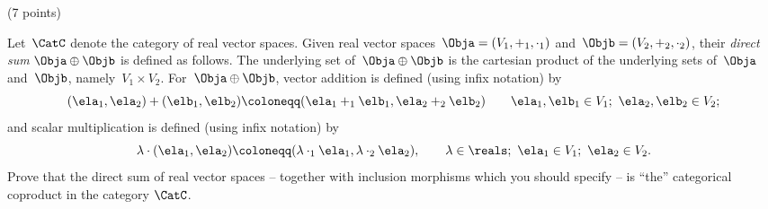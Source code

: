 \documentclass[paper=8.125in:10.250in,pagesize=pdftex,
    headinclude=false,footinclude=false,oneside,egregdoesnotlikesansseriftitles]{kaobook}
\begin{document}
\begin{gradedexercise}\label{ex:DirectSumCopr} (7 points) 


Let~$\CatC$ denote the category of real vector spaces.
Given real vector spaces~$\Obja = (V_1, +_1, \cdot_1)$ and~$\Objb = (V_2, +_2, \cdot_2)$, their \emph{direct sum} $\Obja \oplus \Objb$ is defined as follows.
The underlying set of~$\Obja \oplus \Objb$ is the cartesian product of the underlying sets of~$\Obja$ and~$\Objb$, namely~$V_1 \times V_2$.
For~$\Obja \oplus \Objb$, vector addition is defined (using infix notation) by
\begin{equation*}
(\ela_1, \ela_2) + (\elb_1, \elb_2) \coloneqq (\ela_1 +_1 \elb_1, \ela_2 +_2 \elb_2) \quad \quad \ela_1, \elb_1 \in V_1; \ \ela_2, \elb_2 \in V_2;
\end{equation*}
and scalar multiplication is defined (using infix notation) by
\begin{equation*}
\lambda \cdot (\ela_1, \ela_2) \coloneqq (\lambda \cdot_1 \ela_1, \lambda \cdot_2 \ela_2), \quad \quad \lambda \in \reals; \ \ela_1 \in V_1; \ \ela_2 \in V_2.
\end{equation*}
Prove that the direct sum of real vector spaces -- together with inclusion morphisms which you should specify -- is ``the'' categorical coproduct in the category $\CatC$. 
\end{gradedexercise}


\newpage
\end{document}
